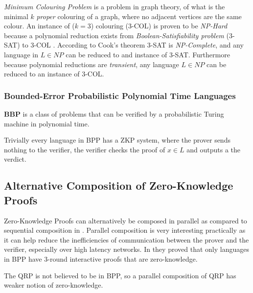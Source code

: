 \textit{Minimum Colouring Problem} is a problem in graph theory, of what is the minimal $k$ \textit{proper} colouring of a graph, where no adjacent vertices are the same colour.
An instance of ($k=3$) colouring (3-COL) is proven to be \textit{NP-Hard} because a polynomial reduction exists from \textit{Boolean-Satisfiability problem} (3-SAT) to 3-COL \cite{mouatadid2014introduction}.
According to Cook's theorem \cite{cook1971complexity} 3-SAT is \textit{NP-Complete}, and any language in $L \in NP$ can be reduced to and instance of 3-SAT. 
Furthermore because polynomial reductions are \textit{transient}, any language $L \in NP$ can be reduced to an instance of 3-COL.

\subsubsection{Bounded-Error Probabilistic Polynomial Time Languages}

\textbf{BBP} is a class of problems that can be verified by a probabilistic Turing machine in polynomial time.

Trivially every language in BPP has a ZKP system, where the prover sends nothing to the verifier, the verifier checks the proof of $x \in L$ and outputs a the verdict. %

\subsection{Alternative Composition of Zero-Knowledge Proofs}
Zero-Knowledge Proofs can alternatively be composed in parallel as compared to sequential composition in \cite{GMR}.
Parallel composition is very interesting practically as it can help reduce the inefficiencies of communication between the prover and the verifier, especially over high latency networks.
\bigskip
\newline
In \cite{goldreich1996composition} they proved that only languages in BPP have 3-round interactive proofs that are zero-knowledge.

The QRP is not believed to be in BPP, so a parallel composition of QRP has weaker notion of zero-knowledge.


